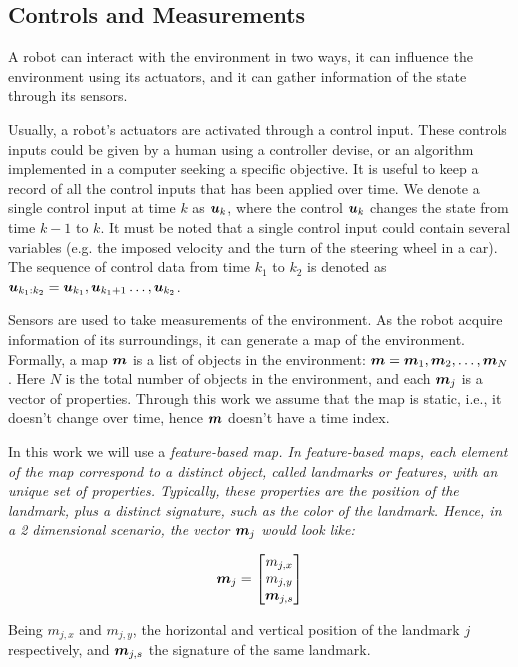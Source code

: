 \subsection{Controls and Measurements}

A robot can interact with the environment in two ways, it can influence the environment using its actuators, and it can gather information of the state through its sensors. 

Usually, a robot's actuators are activated through a control input. These controls inputs could be given by a human using a controller devise, or an algorithm implemented in a computer seeking a specific objective. It is useful to keep a record of all the control inputs that has been applied over time. We denote a single control input at time $k$ as $\boldsymbol{u}_k$, where the control $\boldsymbol{u}_k$ changes the state from  time $k-1$ to $k$. It must be noted that a single control input could contain several variables (e.g. the imposed velocity and the turn of the steering wheel in a car). The sequence of control data from time $k_1$ to $k_2$ is denoted as $\boldsymbol{u}_{k_1:k_2}= \boldsymbol{u}_{k_1},\boldsymbol{u}_{k_1+1}\dots,\boldsymbol{u}_{k_2}$.

Sensors are used to take measurements of the environment. As the robot acquire information of its surroundings, it can generate a map of the environment. Formally, a map $\boldsymbol{m}$ is a list of objects in the environment: $\boldsymbol{m}=\boldsymbol{m}_1,\boldsymbol{m}_2,\dots,\boldsymbol{m}_N$. Here $N$ is the total number of objects in the environment, and each $\boldsymbol{m}_j$ is a vector of properties. Through this work we assume that the map is static, i.e., it doesn't change over time, hence $\boldsymbol{m}$ doesn't have a time index.

In this work we will use a \it{feature-based} map. In feature-based maps, each element of the map correspond to a distinct object, called \it{landmarks} or \it{features}, with an unique set of properties. Typically, these properties are the position of the landmark, plus a distinct signature, such as the color of the landmark. Hence, in a 2 dimensional scenario, the vector $\boldsymbol{m}_j$ would look like:

\begin{equation}
\boldsymbol{m}_j = \begin{bmatrix}
m_{j,x}\\
m_{j,y}\\
\boldsymbol{m}_{j,s}
\end{bmatrix}
\end{equation} 

Being $m_{j,x}$ and $m_{j,y}$, the horizontal and vertical position of the landmark $j$ respectively, and $\boldsymbol{m}_{j,s}$ the signature of the same landmark.

